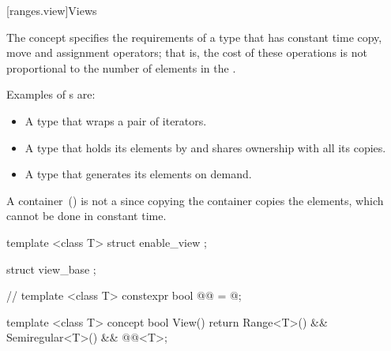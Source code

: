 [ranges.view]{Views}

\pnum
The  concept specifies the requirements of a
 type that has constant time copy, move and assignment operators; that
is, the cost of these operations is not proportional to the number of elements in
the .

\pnum
\enterexample
Examples of s are:

\begin{itemize}
\item A  type that wraps a pair of iterators.

\item A  type that holds its elements by 
and shares ownership with all its copies.

\item A  type that generates its elements on demand.
\end{itemize}

A container~() is not a  since copying the
container copies the elements, which cannot be done in constant time.
\exitexample

\begin{itemdecl}
template <class T>
struct enable_view { };

struct view_base { };

// \expos
template <class T>
constexpr bool @@ = @\seebelow@;

template <class T>
concept bool View() {
  return Range<T>() &&
    Semiregular<T>() &&
    @@<T>;
}
\end{itemdecl}

